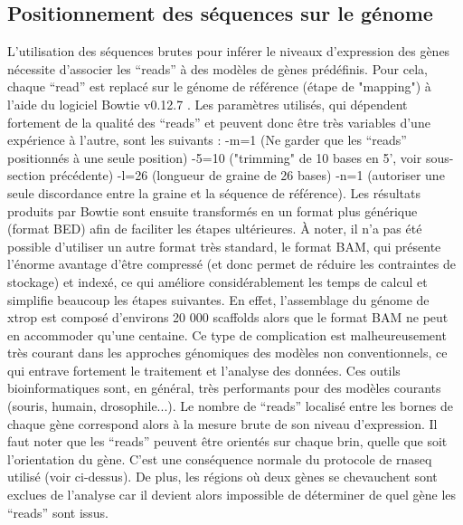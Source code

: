 \documentclass[../main.tex]{subfiles}
\begin{document}
\subsection{Positionnement des séquences sur le génome}
L'utilisation des séquences brutes pour inférer le niveaux d'expression des gènes nécessite d'associer les ``reads'' à des modèles de gènes prédéfinis.
Pour cela, chaque ``read'' est replacé sur le génome de référence (étape de "mapping") à l'aide du logiciel Bowtie v0.12.7 \citep{Langmead2009}. Les paramètres utilisés, qui dépendent fortement de la qualité des ``reads'' et peuvent donc être très variables d'une expérience à l'autre, sont les suivants : -m=1 (Ne garder que les ``reads'' positionnés à une seule position) -5=10 ("trimming" de 10 bases en 5', voir sous-section précédente) -l=26 (longueur de graine de 26 bases) -n=1 (autoriser une seule discordance entre la graine et la séquence de référence).
Les résultats produits par Bowtie sont ensuite transformés en un format plus générique (format BED) afin de faciliter les étapes ultérieures.
À noter, il n'a pas été possible d'utiliser un autre format très standard, le format BAM, qui présente l'énorme avantage d'être compressé (et donc permet de réduire les contraintes de stockage) et indexé, ce qui améliore considérablement les temps de calcul et simplifie beaucoup les étapes suivantes.
En effet, l'assemblage du génome de \gls{xtrop} est composé d'environs 20 000 scaffolds alors que le format BAM ne peut en accommoder qu'une centaine.
Ce type de complication est malheureusement très courant dans les approches génomiques des modèles non conventionnels, ce qui entrave fortement le traitement et l'analyse des données.
Ces outils bioinformatiques sont, en général, très performants pour des modèles courants (souris, humain, drosophile...).
Le nombre de ``reads'' localisé entre les bornes de chaque gène correspond alors à la mesure brute de son niveau d'expression. 
Il faut noter que les ``reads'' peuvent être orientés sur chaque brin, quelle que soit l'orientation du gène.
C'est une conséquence normale du protocole de \gls{rnaseq} utilisé (voir ci-dessus).
De plus, les régions où deux gènes se chevauchent sont exclues de l'analyse car il devient alors impossible de déterminer de quel gène les ``reads'' sont issus.
\end{document}
